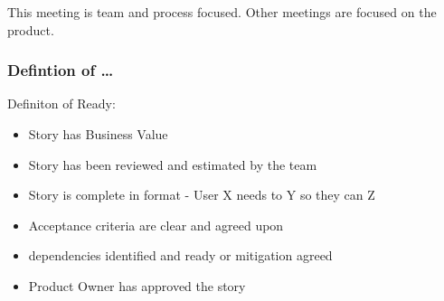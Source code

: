 \newline\newline This meeting is team and process focused. Other meetings are focused on the product.\newline

\subsubsection{Defintion of \ldots}

Definiton of Ready:
\begin{itemize}
		\item Story has Business Value
    \item Story has been reviewed and estimated by the team
    \item Story is complete in format - User X needs to Y so they can Z
    \item Acceptance criteria are clear and agreed upon
		\item dependencies identified and ready or mitigation agreed
		\item Product Owner has approved the story
\end{itemize}

